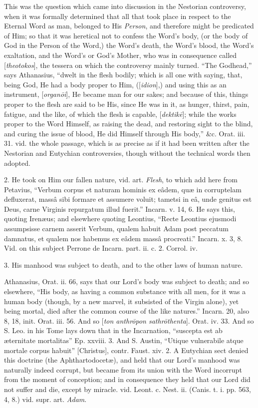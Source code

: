 This was the question which came into discussion
in the Nestorian controversy, when it was formally determined that all
that took place in respect to the Eternal Word as man, belonged to His
\emph{Person}, and therefore might be predicated of Him; so that it
was heretical not to confess the Word's body, (or the body of God in
the Person of the Word,) the Word's death, the Word's blood, the Word's
exaltation, and the Word's or God's Mother, who was in consequence
called [\emph{theotokos}], the tessera on which the controversy mainly
turned. ``The Godhead,'' says Athanasius, ``dwelt in the flesh bodily;
which is all one with saying, that, being God, He had a body proper to
Him, ([\emph{idion}],) and using this as an instrument, [\emph{organ\={o}i}],
He became man for our sakes; and because of this, things proper to the
flesh are said to be His, since He was in it, as hunger, thirst, pain,
fatigue, and the like, of which the flesh is capable, [\emph{dektik\={e}}];
while the works proper to the Word Himself, as raising the dead, and
restoring sight to the blind, and curing the issue of blood, He did
Himself through His body,'' \&c. Orat. iii. 31. vid. the whole
passage, which is as precise as if it had been written after the
Nestorian and Eutychian controversies, though without the technical
words then adopted.

2. He took on Him our fallen nature, vid. art. \emph{Flesh},
to which add here from Petavius, ``Verbum corpus et naturam
hominis ex eâdem, quæ in corruptelam defluxerat, massâ sibi formare
et assumere voluit; tametsi in eâ, unde genitus est Deus, carne
Virginis repurgatum illud fuerit.'' Incarn. v. 14, 6. He says this,
quoting Irenæus; and elsewhere quoting Leontius, ``Recte Leontius
ejusmodi assumpsisse carnem asserit Verbum, qualem habuit Adam post
peccatum damnatus, et qualem nos habemus ex eâdem massâ procreati.''
Incarn. x. 3, 8. Vid. on this subject Perrone de Incarn. part. ii. c.
2. Corrol. iv.

3. His manhood was subject to death, and to the
other laws of human nature.

Athanasius, Orat. ii. 66, says that our Lord's
body was subject to death; and so elsewhere, ``His body, as having a
common substance with all men, for it was a human body (though, by a
new marvel, it subsisted of the Virgin alone), yet being mortal, died
after the common course of the like natures.'' Incarn. 20, also 8, 18,
init. Orat. iii. 56. And so [\emph{ton anthr\={o}pon sathr\={o}thenta}].
Orat. iv. 33. And so S. Leo. in his Tome lays down that in the
Incarnation, ``suscepta est ab æternitate mortalitas'' Ep. xxviii. 3.
And S. Austin, ``Utique vulnerabile atque mortale corpus habuit'' [Christus],
contr. Faust. xiv. 2. A Eutychian sect denied this doctrine (the
Aphthartodocetæ), and held that our Lord's manhood was naturally
indeed corrupt, but became from its union with the Word incorrupt from
the moment of conception; and in consequence they held that our Lord
did not suffer and die, except by miracle. vid. Leont. c. Nest. ii. (Canis.
t. i. pp. 563, 4, 8.) vid. supr. art. \emph{Adam}.

